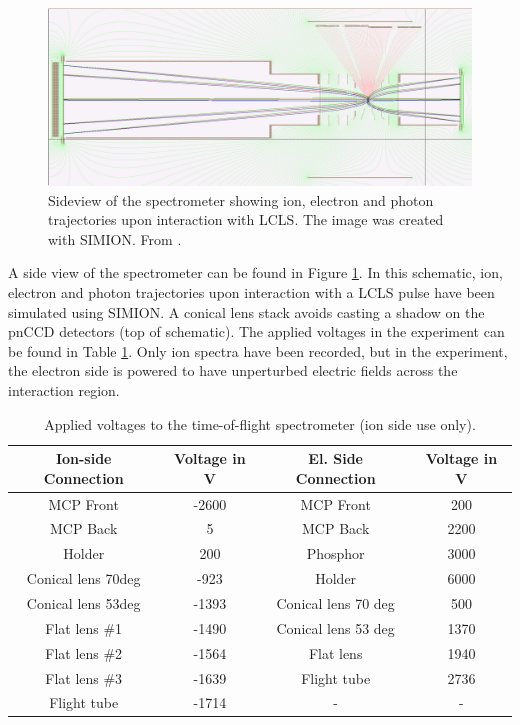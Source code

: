 \begin{figure}
   \includegraphics[width=1.\linewidth]{images/simion.jpg}
    \caption[Sideview of the spectrometer showing ion, electron and photon trajectories.]{Sideview of the spectrometer showing ion, electron and photon trajectories upon interaction with LCLS. The image was created with SIMION. From \citep{Osipov-2013-PC}.}
\label{fig:simion}
\end{figure}
A side view of the spectrometer can be found in Figure \ref{fig:simion}. In this schematic, ion, electron and photon trajectories upon interaction with a LCLS pulse have been simulated using SIMION. A conical lens stack avoids casting a shadow on the pnCCD detectors (top of schematic). The applied voltages in the experiment can be found in Table \ref{tab:tof-volategs}. Only ion spectra have been recorded, but in the experiment, the electron side is powered to have unperturbed electric fields across the interaction region.
\begin{table}
\centering
\begin{tabular}{ | c | c || c | c | }
\hline
	\textbf{Ion-side Connection} & \textbf{Voltage in V} & \textbf{El. Side Connection} & \textbf{Voltage in V} \\ \hline
	MCP Front & -2600 & MCP Front & 200 \\ \hline
	MCP Back & 5 & MCP Back & 2200 \\ \hline
	Holder & 200 & Phosphor & 3000 \\ \hline
	Conical lens 70deg & -923 & Holder & 6000 \\ \hline
	Conical lens 53deg & -1393 & Conical lens 70 deg & 500 \\ \hline
	Flat lens \#1 & -1490 & Conical lens 53 deg & 1370 \\ \hline
	Flat lens \#2 & -1564 & Flat lens & 1940 \\ \hline
	Flat lens \#3 & -1639 & Flight tube & 2736 \\ \hline
	Flight tube & -1714 & - & - \\ \hline
\end{tabular}
\caption{Applied voltages to the time-of-flight spectrometer (ion side use only).}
\label{tab:tof-volategs}
\end{table}
%
%
%
